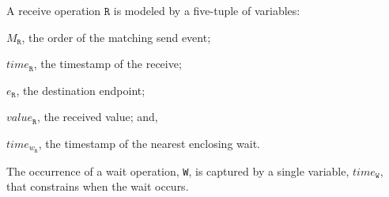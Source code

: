 \begin{definition}[Receive] \label{def:rcv}
A receive operation $\mathtt{R}$ is modeled by a five-tuple of variables:
\begin{compactenum}
\item $M_\mathtt{R}$, the order of the matching send event;
\item $\mathit{time}_\mathtt{R}$, the timestamp of the receive;
\item $e_\mathtt{R}$, the destination endpoint;
\item $\mathit{value}_\mathtt{R}$, the received value; and,
\item $\mathit{time}_{\mathit{w}_\mathtt{R}}$, the timestamp of the nearest enclosing wait.
\end{compactenum}
\end{definition}


\begin{definition}[Wait] \label{def:wait}
The occurrence of a wait operation, \texttt{W}, is captured by a
single variable, $\mathit{time}_\mathtt{W}$, that constrains when
the wait occurs.
\end{definition}


